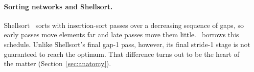 \paragraph{Sorting networks and Shellsort.} Shellsort~\citep{shell1959highspeed} sorts
with insertion-sort passes over a decreasing sequence of gaps, so early passes move
elements far and late passes move them little. \ShuffleSnap\ borrows this schedule.
Unlike Shellsort's final gap-1 pass, however, its final stride-1 stage is not guaranteed
to reach the optimum. That difference turns out to be the heart of the matter
(Section~\ref{sec:anatomy}).
